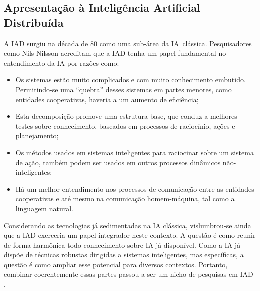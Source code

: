 \documentclass[12pt,final,a4paper]{article}
\theoremstyle{definition}
\begin{document}
\subsection{Apresentação \`{a} Intelig\^encia Artificial Distribuída}

A IAD surgiu na década de 80 como uma sub-\'{a}rea da IA\ cl\'{a}ssica.
Pesquisadores como Nils Nilsson acreditam que a IAD tenha um papel
fundamental no entendimento da IA por razões como:

\begin{itemize}
\item  Os sistemas estão muito complicados e com muito conhecimento
embutido. Permitindo-se uma ``quebra'' desses sistemas em partes menores, como
entidades cooperativas,  haveria a um aumento de efici\^{e}ncia;

\item  Esta decomposição promove uma estrutura
base, que conduz a melhores testes sobre conhecimento, baseados em processos
de raciocínio, ações e planejamento;

\item  Os métodos usados em sistemas inteligentes para raciocinar sobre
um sistema de ação, também podem ser usados em outros processos
din\^{a}micos não-inteligentes;

\item  H\'{a} um  melhor entendimento nos processos de comunicação
entre as entidades cooperativas e até mesmo na comunicação
homem-m\'{a}quina, tal como a linguagem natural.
\end{itemize}

Considerando as tecnologias j\'{a} sedimentadas na IA cl\'{a}ssica,
vislumbrou-se ainda que a IAD exerceria um papel integrador neste contexto.
A questão é  como reunir de forma harm\^{o}nica todo
conhecimento sobre IA j\'{a} disponível.  Como  a IA j\'{a}
dispõe de técnicas robustas dirigidas a sistemas inteligentes, mas
específicas, a questão é  como ampliar esse potencial para
diversos contextos. Portanto,  combinar coerentemente
essas partes passou a ser um nicho de pesquisas em IAD \cite{durfee91a}.
\end{document}
